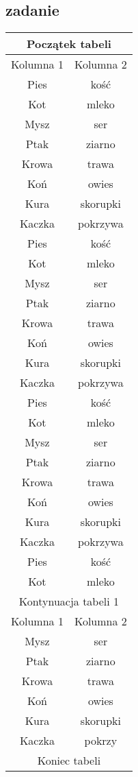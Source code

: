 \documentclass[12pt,a4paper]{article}
\begin{document}
\begin{center}
		\section{zadanie}
		\begin{longtable}{|c|c|}
			\hline
			\multicolumn{2}{|c|}{Początek tabeli}\\
			\hline
			Kolumna 1 & Kolumna 2\\
			\hline
			Pies & kość\\
			Kot & mleko\\
			Mysz & ser\\
			Ptak & ziarno\\
			Krowa & trawa\\
			Koń & owies\\
			Kura & skorupki\\
			Kaczka & pokrzywa\\
			Pies & kość\\
			Kot & mleko\\
			Mysz & ser\\
			Ptak & ziarno\\
			Krowa & trawa\\
			Koń & owies\\
			Kura & skorupki\\
			Kaczka & pokrzywa\\
			Pies & kość\\
			Kot & mleko\\
			Mysz & ser\\
			Ptak & ziarno\\
			Krowa & trawa\\
			Koń & owies\\
			Kura & skorupki\\
			Kaczka & pokrzywa\\
			Pies & kość\\
			Kot & mleko\\
			\hline
			
			\hline
			\multicolumn{2}{|c|}{Kontynuacja tabeli 1}\\
			\hline
			Kolumna 1 & Kolumna 2\\
			\hline
			Mysz & ser\\
			Ptak & ziarno\\
			Krowa & trawa\\
			Koń & owies\\
			Kura & skorupki\\
			Kaczka & pokrzy\\
			\hline
			\multicolumn{2}{|c|}{Koniec tabeli}\\
			\hline
		

\end{longtable}
\end{center}
\end{document}
